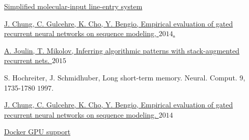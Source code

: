 \documentclass[a4paper]{article}
\begin{document}
\begin{thebibliography}{1}

\href{https://en.wikipedia.org/wiki/Simplified_molecular-input_line-entry_system/}{Simplified molecular-input line-entry system}

\href{http://arxiv.org/abs/1412.3555/}{J. Chung, C. Gulcehre, K. Cho, Y. Bengio, Empirical evaluation of gated recurrent neural networks on sequence modeling, \(2014\).}

\href{http://arxiv.org/abs/1503.01007}{A. Joulin, T. Mikolov, Inferring algorithmic patterns with stack-augmented recurrent nets. \(2015\)}

{S. Hochreiter, J. Schmidhuber, Long short-term memory. Neural. Comput. 9, 1735-1780 \(1997\).}

\href{http://arxiv.org/abs/1412.3555}{J. Chung, C. Gulcehre, K. Cho, Y. Bengio, Empirical evaluation of gated recurrent neural
networks on sequence modeling. \(2014\)}

\href{https://docs.docker.com/compose/gpu-support/}{Docker GPU support}

\end{thebibliography}
\end{document}
